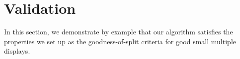 \section{Validation}
\label{sec:evaluation}
In this section, we demonstrate by example that our algorithm satisfies the properties we set up as the goodness-of-split criteria for good small multiple displays.

%

